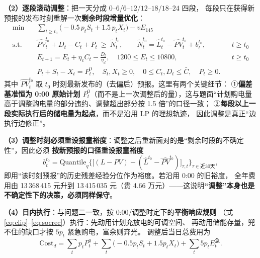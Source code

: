 \textbf{（2\nobreak）逐段滚动调整}\nobreak：把一天分成 $0$--$6$/$6$--$12$/$12$--$18$/$18$--$24$ 四段\nobreak，
每段只在获得新预报的发布时刻重解一次\textbf{剩余时段增量优化}\nobreak：
\begin{align}
\text{min}\quad & \sum_{t\ge t_0}\Big(-0.5\,p_tS_t+1.5\,p_tX_t\Big)-vE_{145}
\label{eq:adj_obj}\\
\text{s.t.}\quad & \widehat{PV}^{t_0}_t+D_t-C_t+P_t\ \ge\ \tilde N^{t_0}_t,\qquad
\tilde N^{t_0}_t=\hat L^{t_0}_t-\widehat{PV}^{t_0}_t+b^{t_0}_t, && t\ge t_0 \label{eq:adj_bal}\\
& E_{t+1}=E_t+\eta_cC_t-\frac{D_t}{\eta_d},\quad 1200\le E_t\le10800, && t\ge t_0 \label{eq:adj_soc}\\
& P_t+S_t-X_t=P^0_t,\quad S_t,X_t\ge0,\quad 0\le C_t,D_t\le\bar C,\quad P_t\ge0. && \label{eq:adj_link}
\end{align}
其中 $\widehat{PV}^{t_0}_t$ 取 $t_0$ 时刻最新发布的（去偏后\nobreak）预报\nobreak。这里有两个关键细节\nobreak：
①\textbf{偏差基准恒为 0:00 原始计划 $P^0_t$}（而不是上一次调整后的量\nobreak）\nobreak，这与题面“计划购电量高于调整购电量的部分违约、调整超出部分按 1.5 倍\nobreak”的口径一致\nobreak；
②\textbf{每段以上一段实际执行后的储电量为起点}\nobreak，而不是沿用 LP 的理想轨迹\nobreak，
因此调整是真正“边执行边修正\nobreak”\nobreak。

\textbf{（3\nobreak）调整时刻必须重设报童裕度}\nobreak：调整之后重新面对的是“剩余时段的不确定性\nobreak”\nobreak，因此必须
\textbf{按新预报的口径重设报童裕度}
\begin{equation}
b^{t_0}_t=\mathrm{Quantile}_{q}\Big\{\big[(L-PV)-( \hat L^{t_0}-\widehat{PV}^{t_0})\big]_{\tau,t}\Big\}_{\tau\in\text{近30天}},
\label{eq:adjbuffer}
\end{equation}
即用“该时刻预报\nobreak”的历史残差经验分位作为裕度\nobreak。若沿用 0:00 的旧裕度\nobreak，
全年费用由 13\,368\,415 元升到 13\,415\,035 元（贵 4.66 万元\nobreak）——这说明\textbf{“调整\nobreak”本身也是不确定性下的决策\nobreak，必须同样保守}\nobreak。

\textbf{（4\nobreak）日内执行}\nobreak：与问题二一致\nobreak，按 0:00/调整时定下的\textbf{平衡响应规则}
（式 \eqref{eq:clip}--\eqref{eq:socrec}\nobreak）执行\nobreak：先动用计划充放电的可调空间\nobreak、
再动用储能存量\nobreak，兜不住的缺口才按 $5p_t$ 紧急购电\nobreak，富余则弃光\nobreak。
调整后当日总费用为
\begin{equation}
\text{Cost}_d=\sum_t p_tP^0_t+\sum_t\Big(-0.5p_tS_t+1.5p_tX_t\Big)+\sum_t 5p_tE^{\text{急}}_t .
\label{eq:q3cost}
\end{equation}

